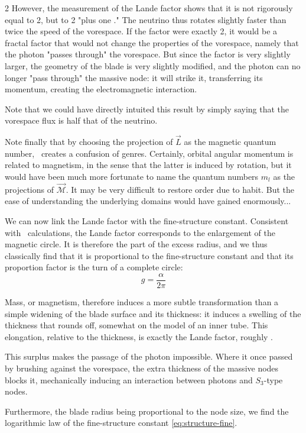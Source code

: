 \begin{multicols}{2}
	However, the measurement of the Lande factor shows that it is not rigorously equal to 2, but to 2 "plus one ." The neutrino thus rotates slightly faster than twice the speed of the vorespace. If the factor were exactly 2, it would be a fractal factor that would not change the properties of the vorespace, namely that the photon "passes through" the vorespace. But since the factor is very slightly larger, the geometry of the blade is very slightly modified, and the photon can no longer "pass through" the massive node: it will strike it, transferring its momentum, creating the electromagnetic interaction.
	
	Note that we could have directly intuited this result by simply saying that the vorespace flux is half that of the neutrino.
	
	Note finally that by choosing the projection of $\vec{L}$ as the magnetic quantum number, \MQ\ creates a confusion of genres. Certainly, orbital angular momentum is related to magnetism, in the sense that the latter is induced by rotation, but it would have been much more fortunate to name the quantum numbers $m_l$ as the projections of $\vec{\mathcal{M}}$. It may be very difficult to restore order due to habit. But the ease of understanding the underlying domains would have gained enormously...
	\medskip
	
	We can now link the Lande factor with the fine-structure constant. Consistent with \MQ\ calculations, the Lande factor corresponds to the enlargement of the magnetic circle. It is therefore the part of the excess radius, and we thus classically find that it is proportional to the fine-structure constant and that its proportion factor is the turn of a complete circle:
	\begin{equation*}
		g = \frac{\alpha}{2\pi}
	\end{equation*} 
	
	Mass, or magnetism, therefore induces a more subtle transformation than a simple widening of the blade surface and its thickness: it induces a swelling of the thickness that rounds off, somewhat on the model of an inner tube. This elongation, relative to the thickness, is exactly the Lande factor, roughly .
	
	This surplus makes the passage of the photon impossible. Where it once passed by brushing against the vorespace, the extra thickness of the massive nodes blocks it, mechanically inducing an interaction between photons and $S_3$-type nodes.
	
	Furthermore, the blade radius being proportional to the node size, we find the logarithmic law of the fine-structure constant \eqref{eq:structure-fine}.
	

\end{multicols}
